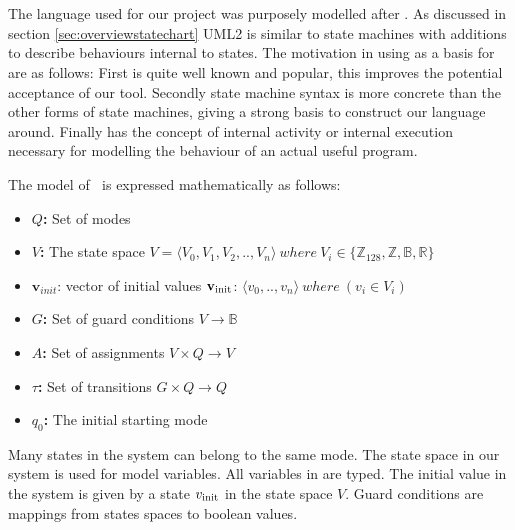 \section{\plcchart}
\label{sec:statechartsem}

The language used for our project was purposely modelled after . As discussed in section \ref{sec:overviewstatechart} UML2 is similar to state machines with additions to describe behaviours internal to states. The motivation in using  as a basis for \emphasize{\plcchart} are as follows: First  is quite well known and popular, this improves the potential acceptance of our tool. Secondly  state machine syntax is more concrete than the other forms of state machines, giving a strong basis to construct our language around. Finally  has the concept of internal activity or internal execution necessary for modelling the behaviour of an actual useful program.

The model of \plcchart $\:$ is expressed mathematically as follows:

\begin{definition}
	\plcchart
	
\begin{itemize}
	\item \textbf{$Q$:} Set of modes
	\item \textbf{$V$:} The state space $V = \langle V_0,V_1,V_2,..,V_n \rangle \: where \: V_{i}\in \lbrace \mathbb{Z}_{128}, \mathbb{Z}, \mathbb{B}, \mathbb{R} \rbrace$
	\item $\mathbf{v}_{init}$: vector of initial values $\mathbf{v}_{\mbox{\scriptsize init}}$: $\langle v_0,..,v_n \rangle \: where \: (v_i \in V_i)$
	\item \textbf{$G$:} Set of guard conditions $V \rightarrow \mathbb{B}$
	\item \textbf{$A$:} Set of assignments $V \times Q \rightarrow V$
	\item \textbf{$\tau$:} Set of transitions $G \times Q \rightarrow Q$
	\item \textbf{$q_0$:} The initial starting mode
\end{itemize}
\end{definition}

Many states in the system can belong to the same mode. The state space in our
system is used for model variables. All variables in \emphasize{\plcchart}
are typed. The initial value in the system is given by a state $v_{\mbox{\scriptsize init}}$ in
the state space $V$.  Guard conditions are mappings from states spaces
to boolean values.

